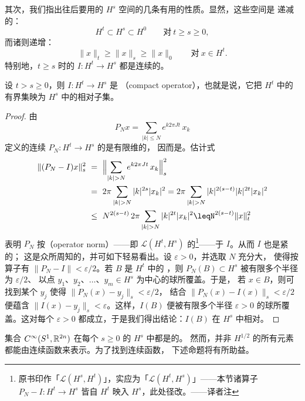 其次，我们指出往后要用的 $H^{s}$ 空间的几条有用的性质。显然，这些空间是%
递减的：
\[
H^{t}\subset H^{s}\subset H^{0}\qquad\text{对}\ t\geq s\geq0,
\]
而诸\trNorm{}则递增：
\[
\|x\|_{t}\geq\|x\|_{s}\geq\|x\|_{0}\qquad\text{对}\ x\in H^{t}.
\]
特别地，$t\geq s$ 时的\trInclusionMapping{} $I:H^{t}\to H^{s}$ 都是连续的。

\begin{proposition}\label{prop:inclusion-map-compact}
设 $t>s\geq0$，则\trInclusionMapping{} $I:H^{t}\to H^{s}$ 是%
\textbf{\trCompactOperator}（compact operator），也就是说，它把 $H^{t}$ 中的%
有界集映为 $H^{s}$ 中的相对\trCompact{}子集。
\end{proposition}

\begin{proof}
由
\[
P_{N}x=\sum_{|k|\leq N}e^{k2\pi Jt}\,x_{k}
\]
定义的连续\trLinear\trOperator{} $P_{N}:H^{t}\to H^{s}$ 的\trRange{}是有限维的，%
因而是\trCompactOperator。估计式
\begin{align*}
\|(P_{N}-I)x\|_{s}^{2}\ &=\ \Bigl\|\sum_{|k|>N}e^{k2\pi Jt}\,x_{k}\Bigr\|_{s}^{2}\\
&=\ 2\pi\sum_{|k|>N}|k|^{2s}|x_{k}|^{2}=%
2\pi\sum_{|k|>N}|k|^{2(s-t)}|k|^{2t}|x_{k}|^{2}\\
&\leq\ N^{2(s-t)}\,2\pi\sum_{|k|>N}|k|^{2t}|x_{k}|^{2}\leq%
N^{2(s-t)}\|x\|_{t}^{2}
\end{align*}
表明 $P_{N}$ 按\textbf{\trOperator\trNorm}（operator norm）——即%
$\mathcal{L}(H^{t},H^{s})$ 的\trNorm\footnote{原书印作「$\mathcal{L}(H^{s},H^{t})$」，实应为「$\mathcal{L}(H^{t},H^{s})$」——本节诸算子 $P_{N}-I:H^{t}\to H^{s}$ 皆自 $H^{t}$ 映入 $H^{s}$，此处径改。——译者注}——\trConverge{}于 $I$。从而 $I$ 也是紧的；%
这是众所周知的，并可如下轻易看出。设 $\varepsilon>0$，并选取 $N$ 充分大，%
使得按算子\trNorm{}有 $\|P_{N}-I\|<\varepsilon/2$。若 $B$ 是 $H^{t}$ 中的%
\trUnitBall，则 $P_{N}(B)\subset H^{s}$ 被有限多个半径为 $\varepsilon/2$、%
以点 $y_{1}$、$y_{2}$、$\dots$、$y_{m}\in H^{s}$ 为中心的球所覆盖。于是，%
若 $x\in B$，则可找到某个 $y_{j}$ 使得 $\|P_{N}(x)-y_{j}\|_{s}<\varepsilon/2$，%
结合 $\|P_{N}(x)-I(x)\|_{s}<\varepsilon/2$ 便蕴含%
$\|I(x)-y_{j}\|_{s}<\varepsilon$。这样，$I(B)$ 便被有限多个半径 $\varepsilon>0$%
的球所覆盖。这对每个 $\varepsilon>0$ 都成立，于是我们得出结论：$I(B)$ 在%
$H^{s}$ 中相对\trCompact。
\end{proof}

集合 $C^{\infty}(S^{1},\mathbb{R}^{2n})$ 在每个 $s\geq0$ 的 $H^{s}$ 中都是\trDense{}的。%
然而，并非 $H^{1/2}$ 的所有元素都能由连续函数来表示。为了找到连续函数，%
下述命题将有所助益。

